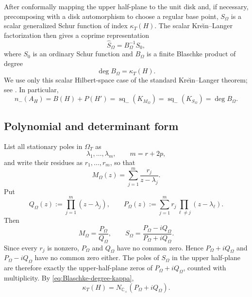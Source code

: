 After conformally mapping the upper half-plane to the unit disk and, if
necessary, precomposing with a disk automorphism to choose a regular base
point, $S_\Omega$ is a scalar generalized Schur function of index
$\kappa_T(H)$.  The scalar Kre\u{\i}n--Langer factorization then gives a
coprime representation
\begin{equation}
\widehat S_\Omega
=
B_\Omega^{-1}S_0,
\label{eq:Krein-Langer-factorization}
\end{equation}
where $S_0$ is an ordinary Schur function and $B_\Omega$ is a finite Blaschke
product of degree
\begin{equation}
\boxed{
\deg B_\Omega=\kappa_T(H).
}
\label{eq:Blaschke-degree-kappa}
\end{equation}
We use only this scalar Hilbert-space case of the standard
Kre\u{\i}n--Langer theorem; see \cite{Lilleberg2020}.  In particular,
\begin{equation}
\boxed{
n_-(A_H)
=
B(H)+P(H')
=
\operatorname{sq}_-(K_{M_\Omega})
=
\operatorname{sq}_-(K_{S_\Omega})
=
\deg B_\Omega.
}
\label{eq:generic-equivalence-chain}
\end{equation}

\subsection{Polynomial and determinant form}

List all stationary poles in $\Omega_T$ as
\[
\lambda_1,\dots,\lambda_m,
\qquad
m=r+2p,
\]
and write their residues as $r_1,\dots,r_m$, so that
\begin{equation}
M_\Omega(z)
=
\sum_{j=1}^{m}\frac{r_j}{z-\lambda_j}.
\label{eq:MOmega-sum-all-poles}
\end{equation}
Put
\begin{equation}
Q_\Omega(z)
:=
\prod_{j=1}^{m}(z-\lambda_j),
\qquad
P_\Omega(z)
:=
\sum_{j=1}^{m}
r_j\prod_{\ell\ne j}(z-\lambda_\ell).
\label{eq:PQ-Omega}
\end{equation}
Then
\[
M_\Omega=\frac{P_\Omega}{Q_\Omega},
\qquad
S_\Omega
=
\frac{P_\Omega-iQ_\Omega}
{P_\Omega+iQ_\Omega}.
\]
Since every $r_j$ is nonzero, $P_\Omega$ and $Q_\Omega$ have no common zero.
Hence $P_\Omega+iQ_\Omega$ and $P_\Omega-iQ_\Omega$ have no common zero
either.  The poles of $S_\Omega$ in the upper half-plane are therefore exactly
the upper-half-plane zeros of $P_\Omega+iQ_\Omega$, counted with multiplicity.
By \eqref{eq:Blaschke-degree-kappa},
\begin{equation}
\boxed{
\kappa_T(H)
=
N_{\mathbb C_+}(P_\Omega+iQ_\Omega).
}
\label{eq:polynomial-zero-count-kappa}
\end{equation}

